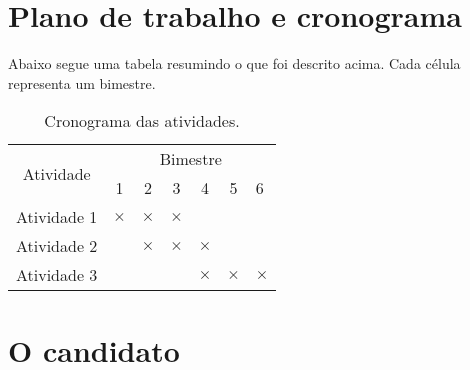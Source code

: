 \documentclass[12pt]{projeto}
\begin{document}
\lipsum[3]

\section{Plano de trabalho e cronograma}

\lipsum[4]

Abaixo segue uma tabela resumindo o que foi descrito acima. Cada célula representa um bimestre.

\begin{table}[ht] %
\centering
\begin{tabular}{|c|c|c|c|c|c|c|}
    \hline
    \multirow{2}{*}{Atividade}            
    & \multicolumn{6}{c|}{Bimestre} \\ \cline{2-7} & 1 & 2 & 3 & 4 & 5 & \multicolumn{1}{l|}{6} \\ \hline
    Atividade 1 & $\times$ & $\times$ & $\times$ & & & \\ \hline
    Atividade 2 & & $\times$ & $\times$ & $\times$ & & \\ \hline
    Atividade 3 & & & & $\times$ & $\times$ & $\times$ \\ \hline
\end{tabular}
\caption{Cronograma das atividades.}
\end{table}

\section{O candidato}

\lipsum[5]
\end{document}
